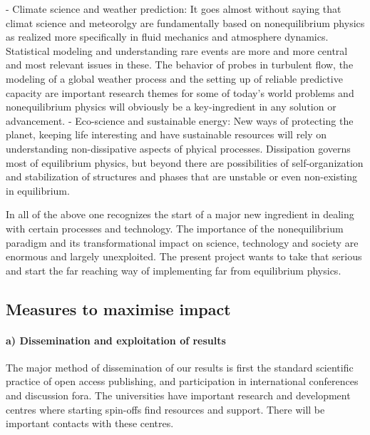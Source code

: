 - Climate science and weather prediction: It goes almost without saying that climat science and meteorolgy are fundamentally based on nonequilibrium physics as realized more specifically in fluid mechanics and atmosphere dynamics. Statistical modeling and understanding rare events are more and more central and most relevant issues in these. The behavior of probes in turbulent flow, the modeling of a global weather process and the setting up of reliable predictive capacity  are important research themes for some of today's world problems and nonequilibrium physics will obviously be a key-ingredient in any solution or advancement. 
- Eco-science and sustainable energy: New ways of protecting the planet, keeping life interesting and have sustainable resources will rely on understanding non-dissipative aspects of phyical processes.  Dissipation governs most of equilibrium physics, but beyond there are possibilities of self-organization and stabilization of structures and phases that are unstable or even non-existing in equilibrium.  

In all of the above one recognizes the start of a major new ingredient in dealing with certain processes and technology.  The importance of the nonequilibrium paradigm and its transformational impact on science, technology and society are enormous and largely unexploited.  The present project wants to take that serious and start the far reaching way of implementing far from equilibrium physics. 




\subsection{Measures to maximise impact}

\paragraph{a) Dissemination and exploitation of results}

The major method of dissemination of our results is first the standard scientific practice of open access publishing, and participation in international conferences and discussion fora.  
The universities have important research and development centres where starting spin-offs find resources and support.
There will be important contacts with these centres.  


